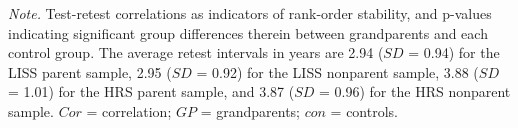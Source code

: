 \documentclass[
  english,
  man, noextraspace]{apa7}
\newenvironment{lltable}{\begin{landscape}\begin{center}\begin{ThreePartTable}}{\end{ThreePartTable}\end{center}\end{landscape}}
\begin{document}
\begin{appendix}
\begin{lltable}
{}

\end{lltable}













\begin{lltable}

\begin{TableNotes}[para]
\normalsize{\textit{Note.} Test-retest correlations as indicators of
rank-order stability, and p-values indicating significant group
differences therein between grandparents and each control group. The
average retest intervals in years are 2.94 (\(SD\) = 0.94) for the LISS
parent sample, 2.95 (\(SD\) = 0.92) for the LISS nonparent sample, 3.88
(\(SD\) = 1.01) for the HRS parent sample, and 3.87 (\(SD\) = 0.96) for
the HRS nonparent sample. \(Cor\) = correlation; \(GP\) = grandparents;
\(con\) = controls.}
\end{TableNotes}

\small{

}
\end{lltable}
\end{appendix}
\end{document}
